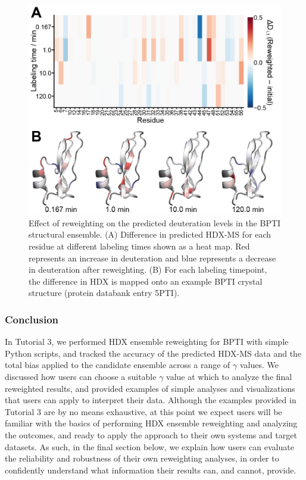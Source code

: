 \documentclass[9pt,tutorial]{livecoms}
\begin{document}
\begin{figure}
    \includegraphics[width=0.98\linewidth]{Fig6_heatmap+structures.png}
    \caption{Effect of reweighting on the predicted deuteration levels in the BPTI structural ensemble. (A) Difference in predicted HDX-MS for each residue at different labeling times shown as a heat map. Red represents an increase in deuteration and blue represents a decrease in deuteration after reweighting. (B) For each labeling timepoint, the difference in HDX is mapped onto an example BPTI crystal structure (protein databank entry 5PTI).}
    \label{fig:heatmap}
\end{figure}

\subsubsection{Conclusion}

In Tutorial 3, we performed HDX ensemble reweighting for BPTI with simple Python scripts, and tracked the accuracy of the predicted HDX-MS data and the total bias applied to the candidate ensemble across a range of $\gamma$ values.
We discussed how users can choose a suitable $\gamma$ value at which to analyze the final reweighted results, and provided examples of simple analyses and visualizations that users can apply to interpret their data.
Although the examples provided in Tutorial 3 are by no means exhaustive, at this point we expect users will be familiar with the basics of performing HDX ensemble reweighting and analyzing the outcomes, and ready to apply the approach to their own systems and target datasets.
As such, in the final section below, we explain how users can evaluate the reliability and robustness of their own reweighting analyses, in order to confidently understand what information their results can, and cannot, provide.
\end{document}
